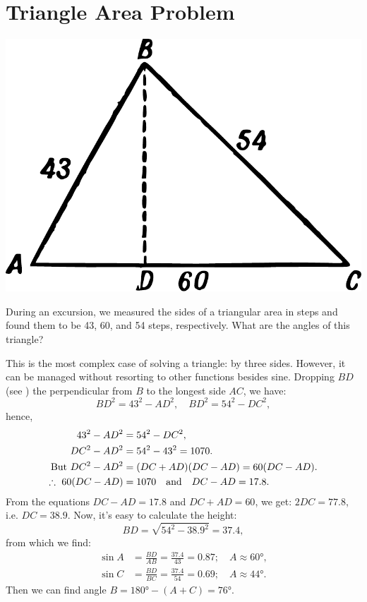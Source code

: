 \section{Triangle Area Problem}
\label{sec-5.7}
\begin{marginfigure}%
\centering
\includegraphics[width=\textwidth]{figures/ch-05/fig-096.pdf}
\end{marginfigure}
\ques During an excursion, we measured the sides of a triangular area in steps and found them to be 43, 60, and 54 steps, respectively. What are the angles of this triangle?



\ans This is the most complex case of solving a triangle: by three sides. However, it can be managed without resorting to other functions besides sine. Dropping $BD$ (see ) the perpendicular from $B$ to the longest side $AC$, we have:
\begin{equation*}%
BD^{2} = 43^{2} - AD^{2}, \quad BD^{2} = 54^{2} - DC^{2},
\end{equation*}
hence,
\begin{align*}%
43^{2} - AD^{2} & = 54^{2} - DC^{2},\\
DC^{2} - AD^{2} & = 54^{2} - 43^{2} = 1070.\\
\text{But} \,\,DC^{2} - AD^{2} & = (DC + AD)(DC - AD) = 60(DC - AD).  \\
\therefore \,\, 60(DC - AD) & = 1070 \qand DC - AD = 17.8. 
\end{align*}
From the equations $DC - AD = 17.8$ and $DC + AD = 60$, we get: 
$2DC = 77.8$, i.e. $DC = 38.9$. Now, it's easy to calculate the height:
\begin{equation*}%
BD = \sqrt{54^{2} - 38.9^{2}} = 37.4,
\end{equation*}
from which we find:
\begin{align*}%
\sin A & = \frac{BD}{AB} = \frac{37.4}{43} = 0.87; \quad A \approx \ang{60},\\
\sin C & = \frac{BD}{BC} = \frac{37.4}{54	} = 0.69; \quad A \approx \ang{44}.
\end{align*}
Then we can find angle $B = \ang{180} - (A + C) = \ang{76}$.

